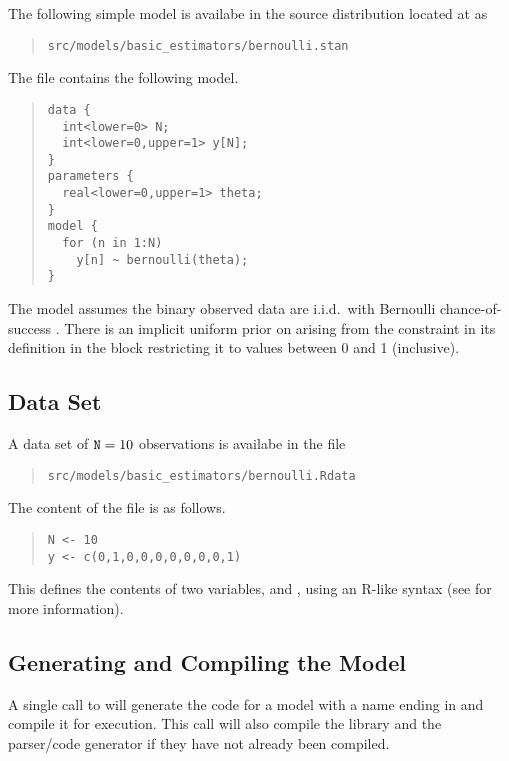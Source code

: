 The following simple model is availabe in the source
distribution located at  as
%
\begin{quote}
\nolinkurl{src/models/basic_estimators/bernoulli.stan}
\end{quote}
%
The file contains the following model.
%
\begin{quote}
\begin{Verbatim}
data {
  int<lower=0> N;
  int<lower=0,upper=1> y[N];
}
parameters {
  real<lower=0,upper=1> theta;
}
model {
  for (n in 1:N)
    y[n] ~ bernoulli(theta);
}
\end{Verbatim}
\end{quote}
%
The model assumes the binary observed data 
are i.i.d.\ with Bernoulli chance-of-success .  There is
an implicit uniform prior on  arising from the
constraint in its definition in the  block
restricting it to values between 0 and 1 (inclusive).

\subsection{Data Set}

A data set of $\mbox{{\tt N}}=10$ observations is availabe in the file
%
\begin{quote}
\nolinkurl{src/models/basic_estimators/bernoulli.Rdata}
\end{quote}
%
The content of the file is as follows.
%
\begin{quote}
\begin{Verbatim}
N <- 10
y <- c(0,1,0,0,0,0,0,0,0,1)
\end{Verbatim}
\end{quote}
%
This defines the contents of two variables,  and ,
using an R-like syntax (see  for more information).



\subsection{Generating and Compiling the Model}

A single call to  will generate the \Cpp code for a
model with a name ending in  and compile it for
execution.  This call will also compile the library 
and the parser/code generator  if they have not already
been compiled.

